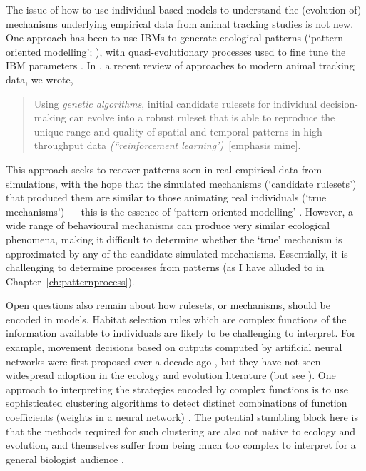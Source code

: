 The issue of how to use individual-based models to understand the (evolution of) mechanisms underlying empirical data from animal tracking studies is not new.
One approach has been to use IBMs to generate ecological patterns (`pattern-oriented modelling'; \cite{grimm2005}), with quasi-evolutionary processes used to fine tune the IBM parameters \parencite{hamblin2013}.
In \textcite{nathan2022}, a recent review of approaches to modern animal tracking data, we wrote,
\begin{quotation}    
        Using \emph{genetic algorithms}, initial candidate rulesets for individual decision-making can evolve into a robust ruleset that is able to reproduce the unique range and quality of spatial and temporal patterns in high-throughput data \emph{(``reinforcement learning')}~[emphasis mine].
\end{quotation}
This approach seeks to recover patterns seen in real empirical data from simulations, with the hope that the simulated mechanisms (`candidate rulesets') that produced them are similar to those animating real individuals (`true mechanisms') --- this is the essence of `pattern-oriented modelling' \parencite{grimm2005}.
However, a wide range of behavioural mechanisms can produce very similar ecological phenomena, making it difficult to determine whether the `true' mechanism is approximated by any of the candidate simulated mechanisms.
Essentially, it is challenging to determine processes from patterns (as I have alluded to in Chapter~\ref{ch:patternprocess}).

Open questions also remain about how rulesets, or mechanisms, should be encoded in models.
Habitat selection rules which are complex functions of the information available to individuals are likely to be challenging to interpret.
For example, movement decisions based on outputs computed by artificial neural networks were first proposed over a decade ago \parencite{mueller2011}, but they have not seen widespread adoption in the ecology and evolution literature (but see \cite{netz2021}).
One approach to interpreting the strategies encoded by complex functions is to use sophisticated clustering algorithms to detect distinct combinations of function coefficients (weights in a neural network) \parencite{bastille-rousseau2019}.
The potential stumbling block here is that the methods required for such clustering are also not native to ecology and evolution, and themselves suffer from being much too complex to interpret for a general biologist audience \parencite[see e.g. the GigaSOM method for clustering single-cell cytometry data; where SOM is a `self organised map', a form of machine learning][]{kratochvil2020}.

